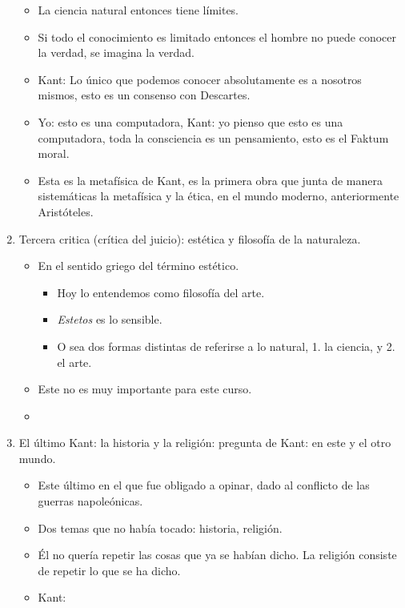 \begin{enumerate}
\begin{itemize}
            \item La ciencia natural entonces tiene límites. 
            \item Si todo el conocimiento es limitado entonces el hombre no puede conocer la verdad, se imagina la verdad.
            \item Kant: Lo único que podemos conocer absolutamente es a nosotros mismos, esto es un consenso con Descartes.
            \item Yo: esto es una computadora, Kant: yo pienso que esto es una computadora, toda la consciencia es un pensamiento, esto es el Faktum moral. 
            \item Esta es la metafísica de Kant, es la primera obra que junta de manera sistemáticas la metafísica y la ética, en el mundo moderno, anteriormente Aristóteles.
        \end{itemize}
    \item Tercera critica (crítica del juicio): estética y filosofía de la naturaleza. 
        \begin{itemize}
            \item En el sentido griego del término estético.
                \begin{itemize}
                    \item Hoy lo entendemos como filosofía del arte. 
                    \item \emph{Estetos} es lo sensible. 
                    \item O sea dos formas distintas de referirse a lo natural, 1. la ciencia, y 2. el arte.
                \end{itemize}
            \item Este no es muy importante para este curso. 
            \item 
        \end{itemize}
    \item El último Kant: la historia y la religión: pregunta de Kant:  en este y el otro mundo.
        \begin{itemize}
            \item Este último en el que fue obligado a opinar, dado al conflicto de las guerras napoleónicas. 
            \item Dos temas que no había tocado: historia, religión. 
            \item Él no quería repetir las cosas que ya se habían dicho. La religión consiste de repetir lo que se ha dicho. 
            \item Kant: 

\end{itemize}
\end{enumerate}

